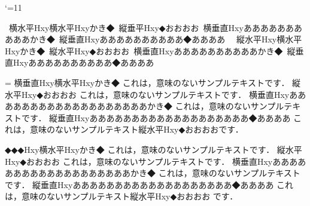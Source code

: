 

%

\catcode`\@=11
\newdimen\@tempdima
\newbox\@tempboxa
\newdimen\fboxrule
\newdimen\fboxsep
\fboxrule=0.4pt\fboxsep=0pt
\long\def\fbox#1{%
  \leavevmode
  \setbox\@tempboxa\hbox{\kern\fboxsep{#1}\kern\fboxsep}%
  \@frameb@x\relax}
\def\@frameb@x#1{%
  \@tempdima\fboxrule
  \advance\@tempdima\fboxsep
  \advance\@tempdima\dp\@tempboxa
  \hbox{%
    \lower\@tempdima\hbox{%
      \vbox{%
        \hrule height\fboxrule
        \hbox{%
          \vrule width\fboxrule
          #1%
          \vbox{%
            \vskip\fboxsep
            \box\@tempboxa
            \vskip\fboxsep}%
          #1%
          \vrule width\fboxrule}%
        \hrule height\fboxrule}%
                          }%
        }%
}
\protected\def\LaTeX{L\kern-.36em%
        {\setbox\z@\hbox{T}
         \vbox to\ht\z@{\hbox{\sevenrm A}%
                        \vss}%
        }%
        \kern-.15em%
        \TeX}

\tentgt

\hbox{\yoko
横水平Hxy\hbox{\yoko 横水平Hxy}かき◆
\hbox{\tate 縦垂平Hxy}◆おおおお
\vbox{\yoko\hsize=30mm 横垂直Hxyああああああああああ}かき◆
\vbox{\tate\hsize=30mm  縦垂直Hxy\hfill ああ\break ああああああああ}◆ああああ
}
\vfill\eject
\hbox{\tate
縦水平Hxy\hbox{\yoko 横水平Hxy}かき◆
\hbox{\tate 縦水平Hxy}◆おおおお
\vbox{\yoko\hsize=30mm 横垂直Hxyああああああああああ}かき◆
\vbox{\tate\hsize=30mm  縦垂直Hxy\hfill ああ\break ああああああああ}◆ああああ
}

\vfill\eject


=\vbox{\yoko\hsize=100mm
横垂直Hxy\hbox{\yoko 横水平Hxy}かき◆
これは，意味のないサンプルテキストです．
\hbox{\tate 縦水平Hxy}◆おおおお
これは，意味のないサンプルテキストです．
\vbox{\yoko\hsize=50mm 横垂直Hxyあああああああああああああああああああ}かき◆
これは，意味のないサンプルテキストです．
\vbox{\tate\hsize=50mm 縦垂直Hxyあああああああああああああああああああ}◆ああああ
これは，意味のないサンプルテキスト\hbox{\tate 縦水平Hxy}◆おおおおです．
}

\vfill\eject
\vbox{\tate\hsize=100mm
◆◆◆Hxy\hbox{\yoko 横水平Hxy}かき◆
これは，意味のないサンプルテキストです．
\hbox{\tate 縦水平Hxy}◆おおおお
これは，意味のないサンプルテキストです．
\vbox{\yoko\hsize=50mm 横垂直Hxyあああああああああああああああああああ}かき◆
これは，意味のないサンプルテキストです．
\vbox{\tate\hsize=50mm  縦垂直Hxyあああああああああああああああああああ}◆ああああ
これは，意味のないサンプルテキスト\hbox{\tate 縦水平Hxy}◆おおおお
です．
}


